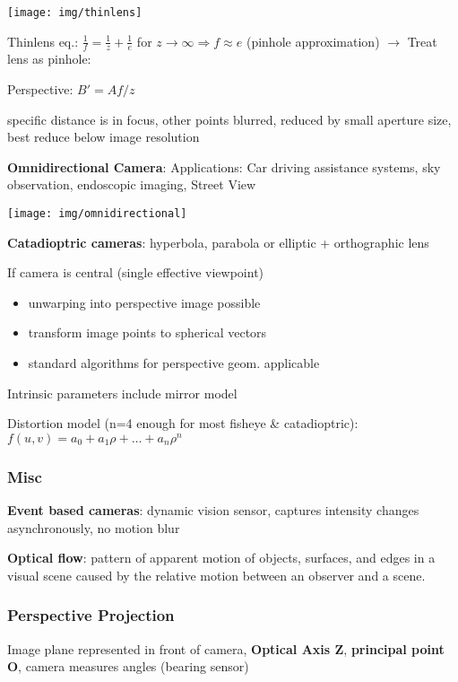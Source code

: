\documentclass[fontsize=6pt]{scrartcl}
\begin{document}
\begin{multicols*}{4}
\begin{minipage}{0.6\linewidth}
	\texttt{[image: img/thinlens]}
\end{minipage}
\begin{minipage}{0.4\linewidth}
	Thinlens eq.: $ \frac{1}{f} = \frac{1}{z} + \frac{1}{e}$ for $z \rightarrow \infty \Rightarrow f \approx e$ (pinhole approximation) $\rightarrow$ Treat lens as pinhole:
	
	Perspective: $B' = A  f/z$

\end{minipage}
specific distance is in focus, other points blurred, reduced by small aperture size, best reduce below image resolution

\textbf{Omnidirectional Camera}: Applications: Car driving assistance systems, sky observation, endoscopic imaging, Street View
{\centering
\texttt{[image: img/omnidirectional]}
\par}
\textbf{Catadioptric cameras}: 
hyperbola, parabola or elliptic + orthographic lens

If camera is central (single effective viewpoint) 
\begin{itemize}
\item unwarping into perspective image possible
\item transform image points to spherical vectors
\item standard algorithms for perspective geom. applicable
\end{itemize}

Intrinsic parameters include mirror model

Distortion model (n=4 enough for most fisheye \& catadioptric): $f(u,v)=a_0+a_1 \rho+\ldots+a_n \rho^n$
\subsubsection*{Misc}
\textbf{Event based cameras}: dynamic vision sensor, captures intensity changes asynchronously, no motion blur

\textbf{Optical flow}: pattern of apparent motion of objects, surfaces, and edges in a visual scene caused by the relative motion between an observer and a scene.

\subsubsection*{Perspective Projection}
Image plane represented in front of camera, \textbf{Optical Axis Z}, \textbf{principal point O}, camera measures angles (bearing sensor)


\end{multicols*}
\end{document}
